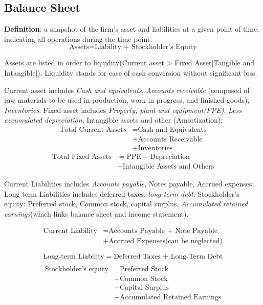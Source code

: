 \documentclass[10pt, a4paper]{article}
\begin{document}
        \subsection{Balance Sheet}
            \textbf{Definition}: a snapshot of the firm's asset and liabilities at a given point of time, indicating all operations during the time point. 
            $$\text{Assets} = \text{Liability + Stockholder's\ Equity}$$

            Assets are listed in order to liquidity(Current asset > Fixed Asset[Tangible and Intangible]). Liquidity stands for ease of cash conversion without significant loss.

            Current asset includes \emph{Cash and equivalents}, \emph{Accounts receivable} (composed of raw materials to be used in production, work in progress, and finished goods), \emph{Inventories}. Fixed asset includes \emph{Property, plant and equipment(PPE)}, \emph{Less accumulated depreciation}, Intangible assets and other  (Amortization);
            \begin{align*}
                \text{Total\ Current\ Asset}s &= \text{Cash\ and\ Equivalents}\\
                                       &+ \text{Accounts\ Receivable}\\
                                       &+ \text{Inventories}  
            \end{align*}
            \begin{align*}
                \text{Total\ Fixed\ Assets} &= \text{PPE} - \text{Depreciation} \\
                                     &+ \text{Intangible Assets and Others}        
            \end{align*}

            Current Liabilities includes \emph{Accounts payable}, Notes payable, Accrued expenses. Long term Liabilities includes deferred taxes, \emph{long-term debt}. Stockholder's equity: Preferred stock, Common stock, capital surplus, \emph{Accumulated retained earnings}(which links balance sheet and income statement).
            
            \begin{align*}
            \text{Current Liability} &= \text{Accounts\ Payable + Note\ Payable} \\
                &+ \text{Accrued Expenses} \text{(can be neglected)}
            \end{align*}

            $$\text{Long\text{-}term Liability} = \text{Deferred\ Taxes + Long\text{-}Term Debt}$$
            \begin{align*}
                \text{Stockholder's\ equity} &= \text{Preferred\ Stock} \\
                                      &+ \text{Common\ Stock}\\
                                      &+ \text{Capital\ Surplus} \\ 
                                      &+ \text{Accumulated Retained Earnings}
            \end{align*}
        
\end{document}

